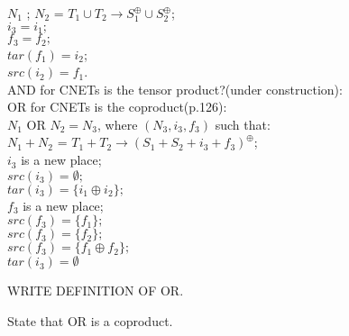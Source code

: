 $N_1$ ; $N_2$ = $T_1 \cup T_2 \rightarrow S_1^\oplus \cup S_2^\oplus$;\\
$i_3 = i_1;$\\
$f_3 = f_2;$\\
$tar(f_1) = i_2$;\\
$src(i_2) = f_1$.\bigskip\\
AND for CNETs is the tensor product?(under construction):\\
OR for CNETs is the coproduct(p.126):\\
$N_1$ OR $N_2 = N_3$, where $(N_3,  i_3, f_3)$ such that:\\
$N_1 + N_2$ = $T_1 + T_2 \rightarrow (S_1 + S_2 + i_3 + f_3)^\oplus$;\\
$i_3$ is a new place;\\
$src(i_3) = \emptyset;$\\
$tar(i_3) =\{i_1 \oplus i_2\};$\\
$f_3$ is a new place;\\
$src(f_3) = \{f_1\};$\\
$src(f_3) = \{f_2\};$\\
$src(f_3) = \{f_1 \oplus f_2\};$\\
$tar(i_3) =\emptyset$\\

\begin{definition}
  \label{def:OR-PN}
  WRITE DEFINITION OF OR.
\end{definition}

\begin{lemma}
  \label{lemma:fill-me-in}
  State that OR is a coproduct.
\end{lemma}


